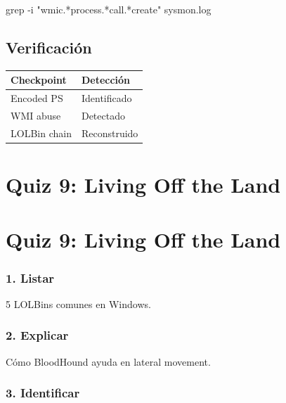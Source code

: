 \documentclass[
  letterpaper,
]{report}
\newenvironment{Shaded}{\begin{snugshade}}{\end{snugshade}}
\newcommand{\AttributeTok}[1]{\textcolor[rgb]{0.40,0.45,0.13}{#1}}
\newcommand{\FunctionTok}[1]{\textcolor[rgb]{0.28,0.35,0.67}{#1}}
\newcommand{\NormalTok}[1]{\textcolor[rgb]{0.00,0.23,0.31}{#1}}
\newcommand{\StringTok}[1]{\textcolor[rgb]{0.13,0.47,0.30}{#1}}
\newcounter{none} %
\begin{document}
\begin{Shaded}
\begin{Highlighting}[]
\FunctionTok{grep} \AttributeTok{{-}i} \StringTok{"wmic.*process.*call.*create"}\NormalTok{ sysmon.log}
\end{Highlighting}
\end{Shaded}

\section{Verificación}\label{verificaciuxf3n-7}

{\def\LTcaptype{none} %
\begin{longtable}[]{@{}ll@{}}
\toprule\noalign{}
Checkpoint & Detección \\
\midrule\noalign{}
\endhead
\bottomrule\noalign{}
\endlastfoot
Encoded PS & Identificado \\
WMI abuse & Detectado \\
LOLBin chain & Reconstruido \\
\end{longtable}
}

\chapter{Quiz 9: Living Off the Land}\label{quiz-9-living-off-the-land}

\chapter{Quiz 9: Living Off the
Land}\label{quiz-9-living-off-the-land-1}

\subsection{1. Listar}\label{listar-1}

5 LOLBins comunes en Windows.

\subsection{2. Explicar}\label{explicar-4}

Cómo BloodHound ayuda en lateral movement.

\subsection{3. Identificar}\label{identificar-4}
\end{document}
